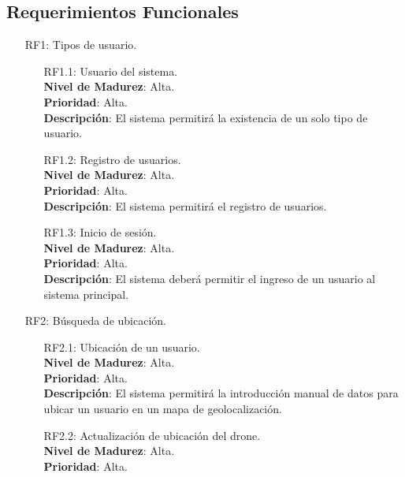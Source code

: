 %
%

\subsection{Requerimientos Funcionales}

\begin{itemize}
	\item[RF1:] Tipos de usuario.
	\begin{itemize}
		\item[RF1.1:] Usuario del sistema. \\
			\textbf{Nivel de Madurez}: Alta. \\
			\textbf{Prioridad}: Alta. \\
			\textbf{Descripción}: El sistema permitirá la existencia 
			de un solo tipo de usuario.
		\item[RF1.2:] Registro de usuarios. \\
			\textbf{Nivel de Madurez}: Alta. \\
			\textbf{Prioridad}: Alta. \\
			\textbf{Descripción}: El sistema permitirá el registro 
			de usuarios.
		\item[RF1.3:] Inicio de sesión. \\
			\textbf{Nivel de Madurez}: Alta. \\
			\textbf{Prioridad}: Alta. \\
			\textbf{Descripción}: El sistema deberá permitir el 
			ingreso de un usuario al sistema principal.
	\end{itemize}
	\item[RF2:] Búsqueda de ubicación.
	\begin{itemize}
		\item[RF2.1:] Ubicación de un usuario. \\
			\textbf{Nivel de Madurez}: Alta. \\
			\textbf{Prioridad}: Alta. \\
			\textbf{Descripción}: El sistema permitirá la 
			introducción manual de datos para ubicar un usuario en 
			un mapa de geolocalización.
		\item[RF2.2:] Actualización de ubicación del drone. \\
			\textbf{Nivel de Madurez}: Alta.\\
			\textbf{Prioridad}: Alta. \\

\end{itemize}
\end{itemize}
